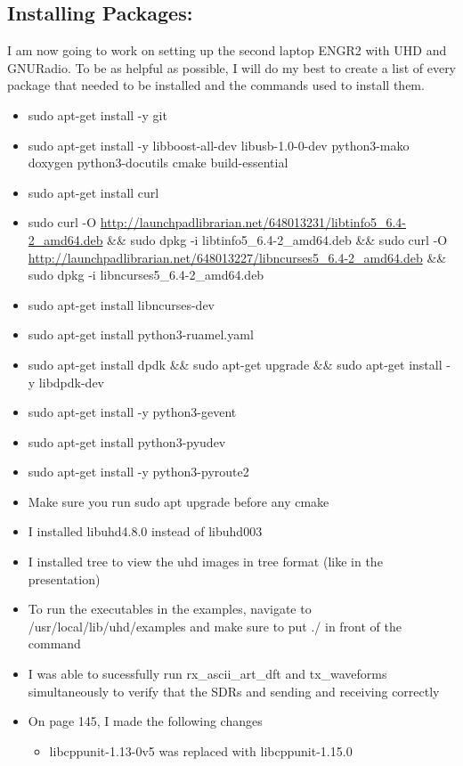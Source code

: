 \documentclass{article}
\begin{document}
\subsection{Installing Packages:}
I am now going to work on setting up the second laptop ENGR2 with UHD and GNURadio. To be as 
helpful as possible, I will do my best to create a list of every package that needed to be installed
and the commands used to install them.
\begin{itemize}
    \item sudo apt-get install -y git
    \item sudo apt-get install -y libboost-all-dev libusb-1.0-0-dev python3-mako doxygen python3-docutils cmake build-essential
    \item sudo apt-get install curl
    \item sudo curl -O \url{http://launchpadlibrarian.net/648013231/libtinfo5_6.4-2_amd64.deb}
    \&\& sudo dpkg -i libtinfo5\_6.4-2\_amd64.deb
    \&\& sudo curl -O \url{http://launchpadlibrarian.net/648013227/libncurses5_6.4-2_amd64.deb}
    \&\& sudo dpkg -i libncurses5\_6.4-2\_amd64.deb
    \item sudo apt-get install libncurses-dev
    \item sudo apt-get install python3-ruamel.yaml
    \item sudo apt-get install dpdk
    \&\& sudo apt-get upgrade
    \&\& sudo apt-get install -y libdpdk-dev
    \item sudo apt-get install -y python3-gevent
    \item sudo apt-get install python3-pyudev
    \item sudo apt-get install -y python3-pyroute2
    \item Make sure you run sudo apt upgrade before any cmake
    \item I installed libuhd4.8.0 instead of libuhd003
    \item I installed tree to view the uhd images in tree format (like in the presentation)
    \item To run the executables in the examples, navigate to /usr/local/lib/uhd/examples and make sure to put ./ in front of the command
    \item I was able to sucessfully run rx_ascii_art_dft and tx_waveforms simultaneously to verify that the SDRs and sending and receiving correctly
    \item On page 145, I made the following changes
    \begin{itemize}
        \item libcppunit-1.13-0v5 was replaced with libcppunit-1.15.0

\end{itemize}
\end{itemize}
\end{document}
